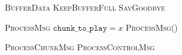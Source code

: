 \documentclass{article}
\begin{document}
\pagestyle{empty}

\newcommand{\send}{\Rightarrow}
\newcommand{\sendto}{\rightarrow}
\algrenewcommand{}

\begin{algorithmic}

  \State \textsc{BufferData}
  \State \textsc{KeepBufferFull}
  \EndWhile
  \State \textsc{SayGoodbye}
  \EndProcedure
  

  
  
\end{algorithmic}

\algrenewcommand{}

\begin{algorithmic}
  \State \textsc{ProcessMsg}
  \State $\mathtt{chunk\_to\_play} = x$
  \State \textsc{ProcessMsg}()
  \EndWhile
  \EndProcedure  
\end{algorithmic}

\begin{algorithmic}
  \State \textsc{ProcessChunkMsg}
  \Else
  \State \textsc{ProcessControlMsg}
  \EndIf
  \EndProcedure  
\end{algorithmic}
\end{document}
